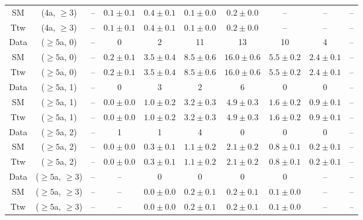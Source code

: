 \begin{table}[h!]
{\begin{tabular}{cccccccccc}
	SM & (4a, $\ge3$) & -- & $0.1\pm 0.1$ & $0.4\pm 0.1$ & $0.1\pm 0.0$ & $0.2\pm 0.0$ & -- & -- & -- \\[0.5ex] 
	Ttw & (4a, $\ge3$) & -- & $0.1\pm 0.1$ & $0.4\pm 0.1$ & $0.1\pm 0.0$ & $0.2\pm 0.0$ & -- & -- & -- \\[0.5ex] 
	Data & ($\ge5$a, 0) & -- & 0 & 2 & 11 & 13 & 10 & 4 & -- \\[0.5ex] 
	SM & ($\ge5$a, 0) & -- & $0.2\pm 0.1$ & $3.5\pm 0.4$ & $8.5\pm 0.6$ & $16.0\pm 0.6$ & $5.5\pm 0.2$ & $2.4\pm 0.1$ & -- \\[0.5ex] 
	Ttw & ($\ge5$a, 0) & -- & $0.2\pm 0.1$ & $3.5\pm 0.4$ & $8.5\pm 0.6$ & $16.0\pm 0.6$ & $5.5\pm 0.2$ & $2.4\pm 0.1$ & -- \\[0.5ex] 
	Data & ($\ge5$a, 1) & -- & 0 & 3 & 2 & 6 & 0 & 0 & -- \\[0.5ex] 
	SM & ($\ge5$a, 1) & -- & $0.0\pm 0.0$ & $1.0\pm 0.2$ & $3.2\pm 0.3$ & $4.9\pm 0.3$ & $1.6\pm 0.2$ & $0.9\pm 0.1$ & -- \\[0.5ex] 
	Ttw & ($\ge5$a, 1) & -- & $0.0\pm 0.0$ & $1.0\pm 0.2$ & $3.2\pm 0.3$ & $4.9\pm 0.3$ & $1.6\pm 0.2$ & $0.9\pm 0.1$ & -- \\[0.5ex] 
	Data & ($\ge5$a, 2) & -- & 1 & 1 & 4 & 0 & 0 & 0 & -- \\[0.5ex] 
	SM & ($\ge5$a, 2) & -- & $0.0\pm 0.0$ & $0.3\pm 0.1$ & $1.1\pm 0.2$ & $2.1\pm 0.2$ & $0.8\pm 0.1$ & $0.2\pm 0.1$ & -- \\[0.5ex] 
	Ttw & ($\ge5$a, 2) & -- & $0.0\pm 0.0$ & $0.3\pm 0.1$ & $1.1\pm 0.2$ & $2.1\pm 0.2$ & $0.8\pm 0.1$ & $0.2\pm 0.1$ & -- \\[0.5ex] 
	Data & ($\ge5$a, $\ge3$) & -- & -- & 0 & 0 & 0 & 0 & -- & -- \\[0.5ex] 
	SM & ($\ge5$a, $\ge3$) & -- & -- & $0.0\pm 0.0$ & $0.2\pm 0.1$ & $0.2\pm 0.1$ & $0.1\pm 0.0$ & -- & -- \\[0.5ex] 
	Ttw & ($\ge5$a, $\ge3$) & -- & -- & $0.0\pm 0.0$ & $0.2\pm 0.1$ & $0.2\pm 0.1$ & $0.1\pm 0.0$ & -- & -- \\[0.5ex] 
	\hline
	\hline
\end{tabular}}
\end{table}

